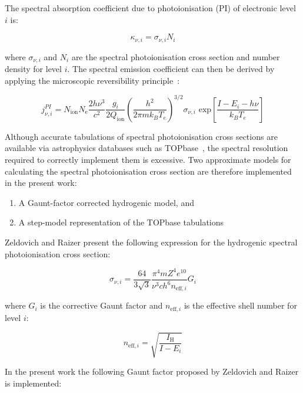 The spectral absorption coefficient due to photoionisation (PI) of electronic level $i$ is:

\begin{equation}
 \kappa_{\nu,i} = \sigma_{\nu,i} N_i
\end{equation}

\noindent where $ \sigma_{\nu,i}$ and $N_i$ are the spectral photoionisation cross section and number density for level $i$.
The spectral emission coefficient can then be derived by applying the microscopic reversibility principle~\cite{ZR}:

\begin{equation}
 j_{\nu,i}^{PI} = N_\text{ion} N_\text{e} \frac{2 h \nu^3}{c^2} \frac{g_i}{2 Q_\text{ion}} \left ( \frac{h^2}{2 \pi m k_B T_e} \right )^{3/2} \sigma_{\nu,i} \text{~exp} \left [ \frac{I - E_i - h \nu}{k_B T_e} \right ]
\end{equation}

Although accurate tabulations of spectral photoionisation cross sections are available via astrophysics databases such as TOPbase~\cite{TOPbase}, the spectral resolution required to correctly implement them is excessive.
Two approximate models for calculating the spectral photoionisation cross section are therefore implemented in the present work:

\begin{enumerate}
 \item A Gaunt-factor corrected hydrogenic model, and
 \item  A step-model representation of the TOPbase tabulations~\cite{JohnPhd}
\end{enumerate}

Zeldovich and Raizer present the following expression for the hydrogenic spectral photoionisation cross section:

\begin{equation}
 \sigma_{\nu,i} = \frac{64}{3\sqrt{3}} \frac{\pi^4 m Z^4 e^10}{\nu^3 c h^6 n_{\text{eff},i} } G_i \label{eq:sigma_bf}
\end{equation}

\noindent where $G_i$ is the corrective Gaunt factor and $n_{\text{eff},i}$ is the effective shell number for level $i$:

\begin{equation}
 n_{\text{eff},i} = \sqrt{\frac{I_\text{H}}{I - E_i}}
\end{equation}

\noindent In the present work the following Gaunt factor proposed by Zeldovich and Raizer is implemented:


